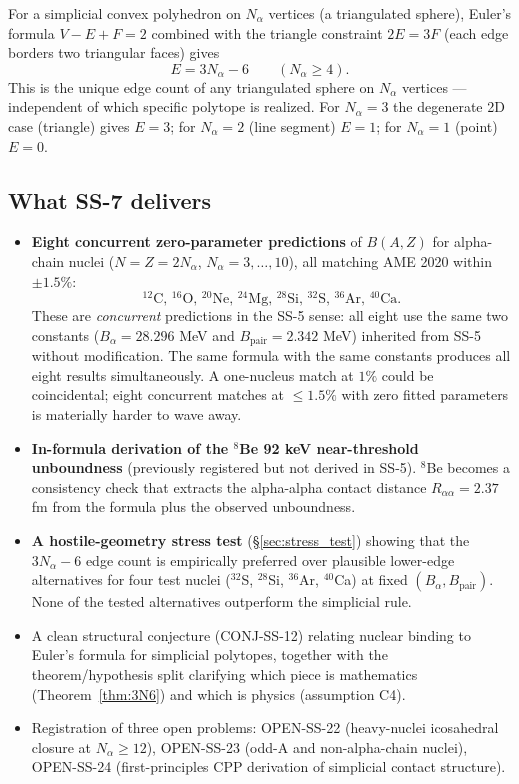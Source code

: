 \documentclass[11pt,letterpaper]{article}
\newcommand{\Bpair}{B_{\mathrm{pair}}}
\newcommand{\Balpha}{B_{\alpha}}
\newcommand{\Nalpha}{N_{\alpha}}
\newcommand{\Raa}{R_{\alpha\alpha}}
\begin{document}
For a simplicial convex polyhedron on $\Nalpha$ vertices (a triangulated sphere), Euler's formula $V - E + F = 2$ combined with the triangle constraint $2E = 3F$ (each edge borders two triangular faces) gives
\begin{equation}
E = 3\Nalpha - 6 \qquad (\Nalpha \geq 4).
\label{eq:edges}
\end{equation}
This is the unique edge count of any triangulated sphere on $\Nalpha$ vertices --- independent of which specific polytope is realized. For $\Nalpha = 3$ the degenerate 2D case (triangle) gives $E = 3$; for $\Nalpha = 2$ (line segment) $E = 1$; for $\Nalpha = 1$ (point) $E = 0$.

\subsection{What SS-7 delivers}

\begin{itemize}
\item \textbf{Eight concurrent zero-parameter predictions} of $B(A, Z)$ for alpha-chain nuclei ($N = Z = 2\Nalpha$, $\Nalpha = 3, \ldots, 10$), all matching AME 2020 within $\pm 1.5\%$:
\[
{}^{12}\mathrm{C}, \, {}^{16}\mathrm{O}, \, {}^{20}\mathrm{Ne}, \, {}^{24}\mathrm{Mg}, \, {}^{28}\mathrm{Si}, \, {}^{32}\mathrm{S}, \, {}^{36}\mathrm{Ar}, \, {}^{40}\mathrm{Ca}.
\]
These are \emph{concurrent} predictions in the SS-5 sense: all eight use the same two constants ($\Balpha = 28.296$ MeV and $\Bpair = 2.342$ MeV) inherited from SS-5 without modification. The same formula with the same constants produces all eight results simultaneously. A one-nucleus match at $1\%$ could be coincidental; eight concurrent matches at $\leq 1.5\%$ with zero fitted parameters is materially harder to wave away.
\item \textbf{In-formula derivation of the ${}^8$Be 92 keV near-threshold unboundness} (previously registered but not derived in SS-5). ${}^8$Be becomes a consistency check that extracts the alpha-alpha contact distance $\Raa = 2.37$ fm from the formula plus the observed unboundness.
\item \textbf{A hostile-geometry stress test} (\S\ref{sec:stress_test}) showing that the $3\Nalpha - 6$ edge count is empirically preferred over plausible lower-edge alternatives for four test nuclei (${}^{32}$S, ${}^{28}$Si, ${}^{36}$Ar, ${}^{40}$Ca) at fixed $(\Balpha, \Bpair)$. None of the tested alternatives outperform the simplicial rule.
\item A clean structural conjecture (CONJ-SS-12) relating nuclear binding to Euler's formula for simplicial polytopes, together with the theorem/hypothesis split clarifying which piece is mathematics (Theorem~\ref{thm:3N6}) and which is physics (assumption C4).
\item Registration of three open problems: OPEN-SS-22 (heavy-nuclei icosahedral closure at $\Nalpha \geq 12$), OPEN-SS-23 (odd-A and non-alpha-chain nuclei), OPEN-SS-24 (first-principles CPP derivation of simplicial contact structure).
\end{itemize}
\end{document}
